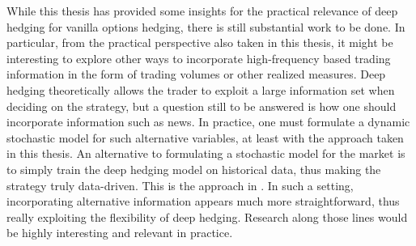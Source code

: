 While this thesis has provided some insights for the practical relevance of deep hedging for vanilla options hedging, there is still substantial work to be done. In particular, from the practical perspective also taken in this thesis, it might be interesting to explore other ways to incorporate high-frequency based trading information in the form of trading volumes or other realized measures. Deep hedging theoretically allows the trader to exploit a large information set when deciding on the strategy, but a question still to be answered is how one should incorporate information such as news. In practice, one must formulate a dynamic stochastic model for such alternative variables, at least with the approach taken in this thesis. An alternative to formulating a stochastic model for the market is to simply train the deep hedging model on historical data, thus making the strategy truly data-driven. This is the approach in \cite{mikkila2021empirical}. In such a setting, incorporating alternative information appears much more straightforward, thus really exploiting the flexibility of deep hedging. Research along those lines would be highly interesting and relevant in practice.



